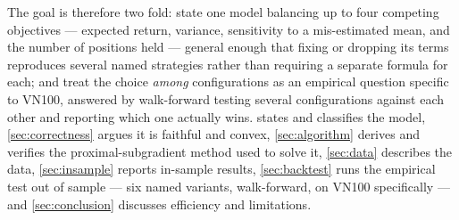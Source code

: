 The goal is therefore two fold: state one model balancing up to four competing objectives ---
expected return, variance, sensitivity to a mis-estimated mean, and the number of positions held
--- general enough that fixing or dropping its terms reproduces several named strategies rather
than requiring a separate formula for each; and treat the choice \emph{among} configurations as an
empirical question specific to VN100, answered by walk-forward testing several configurations
against each other and reporting which one actually wins.  states and
classifies the model, \cref{sec:correctness} argues it is faithful and convex,
\cref{sec:algorithm} derives and verifies the proximal-subgradient method used to solve it,
\cref{sec:data} describes the data, \cref{sec:insample} reports in-sample results,
\cref{sec:backtest} runs the empirical test out of sample --- six named variants, walk-forward, on
VN100 specifically --- and \cref{sec:conclusion} discusses efficiency and limitations.
